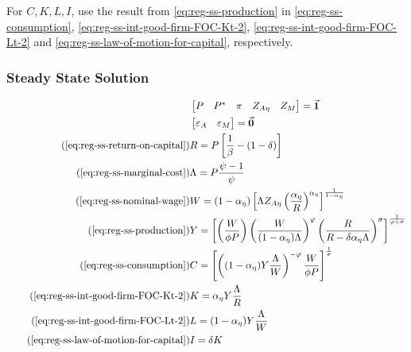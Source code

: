 \documentclass[
	thesis.tex
	]{subfiles}
\begin{document}
For $C,K,L,I$, use the result from \ref{eq:reg-ss-production} in \ref{eq:reg-ss-consumption}, \ref{eq:reg-ss-int-good-firm-FOC-Kt-2}, \ref{eq:reg-ss-int-good-firm-FOC-Lt-2} and \ref{eq:reg-ss-law-of-motion-for-capital}, respectively.


\subsubsection{Steady State Solution}

\vspace*{-1cm}

\begin{align}
	\label{eq:reg-unity-vector}
	& \begin{bmatrix}
		P & P^\ast & \pi & Z_{A\eta} & Z_M
	\end{bmatrix} = \vec{\bm{1}} \\
	\label{eq:reg-null-vector}
	& \begin{bmatrix}
		\varepsilon_A & \varepsilon_{M}
	\end{bmatrix} = \vec{\bm{0}}\\
	\tag{\ref{eq:reg-ss-return-on-capital}}
	& R = P\left[ \frac{1}{\beta} - (1-\delta) \right] \\
	\tag{\ref{eq:reg-ss-marginal-cost}}
	& \Lambda = P \frac{\psi-1}{\psi} \\
	\tag{\ref{eq:reg-ss-nominal-wage}}
	& W = (1-{\alpha_\eta}) \left[ \Lambda Z_{A\eta} \left( \frac{{\alpha_\eta}}{R} \right)^{{\alpha_\eta}} \right]^\frac{1}{1-{\alpha_\eta}} \\
	\tag{\ref{eq:reg-ss-production}}
	& Y =\left[
	\left( \frac{W}{\phi P}                \right)
	\left( \frac{W}{(1-{\alpha_\eta})\Lambda}     \right)^\varphi
	\left( \frac{R}{R-\delta{\alpha_\eta}\Lambda} \right)^\sigma
	\right]^\frac{1}{\varphi+\sigma} \\
	\tag{\ref{eq:reg-ss-consumption}}
	& C = \left[ \left( (1-{\alpha_\eta}) Y \frac{\Lambda}{W} \right)^{-\varphi} \frac{W}{\phi P} \right]^{\frac{1}{\sigma}} \\
	\tag{\ref{eq:reg-ss-int-good-firm-FOC-Kt-2}}
	& K = {\alpha_\eta} Y \frac{\Lambda}{R} \\
	\tag{\ref{eq:reg-ss-int-good-firm-FOC-Lt-2}}
	& L = (1-{\alpha_\eta}) Y \frac{\Lambda}{W} \\
	\tag{\ref{eq:reg-ss-law-of-motion-for-capital}}
	& I = \delta K
\end{align}
\end{document}
